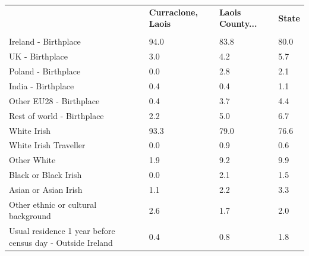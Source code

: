\documentclass{article}
\begin{document}
\pagebreak
\begin{table}[h]	
\centering
		\begin{tabular}{KTTT}
  \hline
& \textbf{Curraclone, Laois} & \textbf{Laois County...} & \textbf{State}\\ 
  \hline
    \\ 
    \hline
Ireland - Birthplace & 94.0& 83.8& 80.0\\
UK - Birthplace & 3.0& 4.2& 5.7\\
Poland - Birthplace & 0.0& 2.8& 2.1\\
India - Birthplace & 0.4& 0.4& 1.1\\
Other EU28 - Birthplace & 0.4& 3.7& 4.4\\
Rest of world - Birthplace & 2.2& 5.0& 6.7\\
    \hline
White Irish & 93.3& 79.0& 76.6\\
White Irish Traveller & 0.0& 0.9& 0.6\\
Other White & 1.9& 9.2& 9.9\\
Black or Black Irish & 0.0& 2.1& 1.5\\
Asian or Asian Irish & 1.1& 2.2& 3.3\\
Other ethnic or cultural background & 2.6& 1.7& 2.0\\
    \hline
Usual residence 1 year before census day - Outside Ireland & 0.4& 0.8& 1.8\\


\end{tabular}
\end{table}
\end{document}
